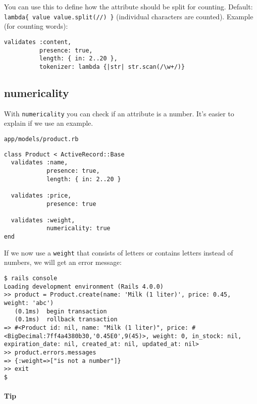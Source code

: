 \documentclass[a4paper]{book}
\def\w3cdtfymd{\the\year-\ifnum\month<10 0\fi\the\month-\ifnum\day<10 0\fi\the\day}
\begin{document}
You can use this to define how the attribute should be split for counting. Default: \texttt{lambda\{ \textbar{}value\textbar{} value.split(//) \}} (individual characters are counted). Example (for counting words):

\begin{shaded}\begin{verbatim}
validates :content,
          presence: true,
          length: { in: 2..20 },
          tokenizer: lambda {|str| str.scan(/\w+/)}
\end{verbatim}\end{shaded}

\subsection{numericality}\label{numericality}

With \texttt{numericality} you can check if an attribute is a number. It's easier to explain if we use an example.

\texttt{app/models/product.rb}

\begin{shaded}\begin{verbatim}
class Product < ActiveRecord::Base
  validates :name,
            presence: true,
            length: { in: 2..20 }

  validates :price,
            presence: true

  validates :weight,
            numericality: true
end
\end{verbatim}\end{shaded}

If we now use a \texttt{weight} that consists of letters or contains letters instead of numbers, we will get an error message:

\begin{shaded}\begin{verbatim}
$ rails console
Loading development environment (Rails 4.0.0)
>> product = Product.create(name: 'Milk (1 liter)', price: 0.45, weight: 'abc')
   (0.1ms)  begin transaction
   (0.1ms)  rollback transaction
=> #<Product id: nil, name: "Milk (1 liter)", price: #<BigDecimal:7ff4a4380b30,'0.45E0',9(45)>, weight: 0, in_stock: nil, expiration_date: nil, created_at: nil, updated_at: nil>
>> product.errors.messages
=> {:weight=>["is not a number"]}
>> exit
$
\end{verbatim}\end{shaded}

\paragraph{Tip}\label{tip-10}
\end{document}
